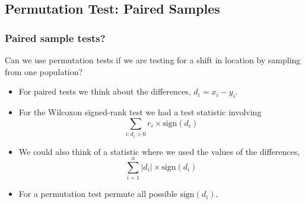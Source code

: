 \documentclass[a4paper]{article}
\begin{document}
\subsection{Permutation Test: Paired Samples}
\subsubsection{Paired sample tests?}
Can we use permutation tests if we are testing for a shift in location by sampling from one population?
\begin{itemize}
	\item For paired tests we think about the differences, \( d_i = x_i - y_i \).
	\item For the Wilcoxon signed-rank test we had a test statistic involving
	\[
		\sum_{i: d_i > 0} r_i \times \mathrm{sign}(d_i)
	\]
	\item We could also think of a statistic where we used the values of the differences,
	\[
		\sum_{i=1}^{n} \lvert d_i \rvert \times \mathrm{sign}(d_i)
	\]
	\item For a permutation test permute all possible \( \mathrm{sign}(d_i) \).
\end{itemize}
\end{document}
